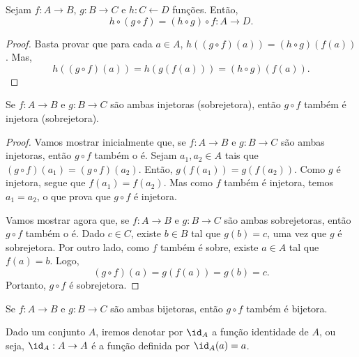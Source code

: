 \documentclass{article}
\begin{document}
\begin{proposition}
Sejam $f:A\rightarrow B$, $g:B \rightarrow C$ e $h:C\leftarrow D$
fun\c{c}\~oes. Ent\~ao,
$$
h\circ(g \circ f)=(h \circ g)\circ f:A \rightarrow D.
$$
\end{proposition}
\begin{proof}
Basta provar que para cada $a \in A$, $h((g \circ f)(a))=(h \circ
g)(f(a))$. Mas,
$$
h((g \circ f)(a))=h(g(f(a)))=(h \circ g)(f(a)).
$$
\end{proof}
\begin{theorem}
Se $f:A \rightarrow B$ e $g:B \rightarrow C$ s\~ao ambas injetoras
(sobrejetora), ent\~ao $g \circ f$ tamb\'em \'e injetora (sobrejetora).
\end{theorem}
\begin{proof}
Vamos mostrar inicialmente que, se $f:A \rightarrow B$ e $g:B
\rightarrow C$ s\~ao ambas injetoras, ent\~ao $g \circ f$ tamb\'em o \'e.
Sejam $a_1, a_2 \in A$ tais que $(g \circ f)(a_1)=(g \circ
f)(a_2)$. Ent\~ao, $g(f(a_1))=g(f(a_2))$. Como $g$ \'e injetora, segue
que $f(a_1)=f(a_2)$. Mas como $f$ tamb\'em \'e injetora, temos
$a_1=a_2$, o que prova que $g \circ f$ \'e injetora.

Vamos mostrar agora que, se $f:A \rightarrow B$ e $g:B \rightarrow
C$ s\~ao ambas sobrejetoras, ent\~ao $g \circ f$ tamb\'em o \'e. Dado $c
\in C$, existe $b \in B$ tal que $g(b)=c$, uma vez que $g$ \'e
sobrejetora. Por outro lado, como $f$ tamb\'em \'e sobre, existe $a \in A$
tal que $f(a)=b$. Logo,
$$
(g \circ f)(a)=g(f(a))=g(b)=c.
$$
Portanto, $g \circ f$ \'e sobrejetora.
\end{proof}
\begin{corollary}\label{comp-bi}
Se $f:A \rightarrow B$ e $g:B \rightarrow C$ s\~ao ambas bijetoras,
ent\~ao $g \circ f$ tamb\'em \'e bijetora.
\end{corollary}

Dado um conjunto $A$, iremos denotar por $\id_A$ a fun\c{c}\~ao
identidade de $A$, ou seja, $\id_A:A \rightarrow A$ \'e a fun\c{c}\~ao
definida por $\id_A(a)=a$.
\end{document}
